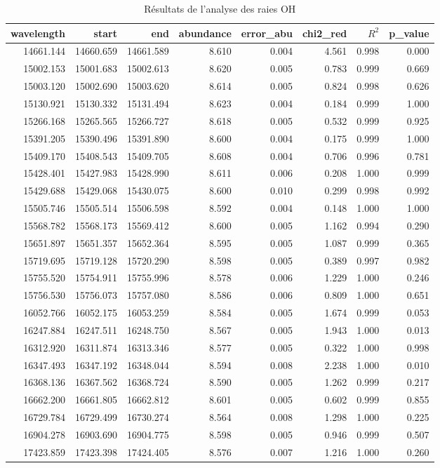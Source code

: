 \begin{table}
\caption{Résultats de l'analyse des raies OH}
\label{tab:resultats_OH}
\begin{tabular}{rrrrrrrr}
\toprule
wavelength & start & end & abundance & error_abu & chi2_red & $R^2$ & p_value \\
\midrule
14661.144 & 14660.659 & 14661.589 & 8.610 & 0.004 & 4.561 & 0.998 & 0.000 \\
15002.153 & 15001.683 & 15002.613 & 8.620 & 0.005 & 0.783 & 0.999 & 0.669 \\
15003.120 & 15002.690 & 15003.620 & 8.614 & 0.005 & 0.824 & 0.998 & 0.626 \\
15130.921 & 15130.332 & 15131.494 & 8.623 & 0.004 & 0.184 & 0.999 & 1.000 \\
15266.168 & 15265.565 & 15266.727 & 8.618 & 0.005 & 0.532 & 0.999 & 0.925 \\
15391.205 & 15390.496 & 15391.890 & 8.600 & 0.004 & 0.175 & 0.999 & 1.000 \\
15409.170 & 15408.543 & 15409.705 & 8.608 & 0.004 & 0.706 & 0.996 & 0.781 \\
15428.401 & 15427.983 & 15428.990 & 8.611 & 0.006 & 0.208 & 1.000 & 0.999 \\
15429.688 & 15429.068 & 15430.075 & 8.600 & 0.010 & 0.299 & 0.998 & 0.992 \\
15505.746 & 15505.514 & 15506.598 & 8.592 & 0.004 & 0.148 & 1.000 & 1.000 \\
15568.782 & 15568.173 & 15569.412 & 8.600 & 0.005 & 1.162 & 0.994 & 0.290 \\
15651.897 & 15651.357 & 15652.364 & 8.595 & 0.005 & 1.087 & 0.999 & 0.365 \\
15719.695 & 15719.128 & 15720.290 & 8.598 & 0.005 & 0.389 & 0.997 & 0.982 \\
15755.520 & 15754.911 & 15755.996 & 8.578 & 0.006 & 1.229 & 1.000 & 0.246 \\
15756.530 & 15756.073 & 15757.080 & 8.586 & 0.006 & 0.809 & 1.000 & 0.651 \\
16052.766 & 16052.175 & 16053.259 & 8.584 & 0.005 & 1.674 & 0.999 & 0.053 \\
16247.884 & 16247.511 & 16248.750 & 8.567 & 0.005 & 1.943 & 1.000 & 0.013 \\
16312.920 & 16311.874 & 16313.346 & 8.577 & 0.005 & 0.322 & 1.000 & 0.998 \\
16347.493 & 16347.192 & 16348.044 & 8.594 & 0.008 & 2.238 & 1.000 & 0.010 \\
16368.136 & 16367.562 & 16368.724 & 8.590 & 0.005 & 1.262 & 0.999 & 0.217 \\
16662.200 & 16661.805 & 16662.812 & 8.601 & 0.005 & 0.602 & 0.999 & 0.855 \\
16729.784 & 16729.499 & 16730.274 & 8.564 & 0.008 & 1.298 & 1.000 & 0.225 \\
16904.278 & 16903.690 & 16904.775 & 8.598 & 0.005 & 0.946 & 0.999 & 0.507 \\
17423.859 & 17423.398 & 17424.405 & 8.576 & 0.007 & 1.216 & 1.000 & 0.260 \\
\bottomrule
\end{tabular}
\end{table}
